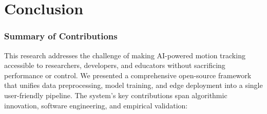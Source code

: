 \chapter{Conclusion}
\label{chap:conclusion}

\subsection{Summary of Contributions}

This research addresses the challenge of making AI-powered motion tracking accessible to researchers, developers, and educators without sacrificing performance or control. We presented a comprehensive open-source framework that unifies data preprocessing, model training, and edge deployment into a single user-friendly pipeline. The system's key contributions span algorithmic innovation, software engineering, and empirical validation:

